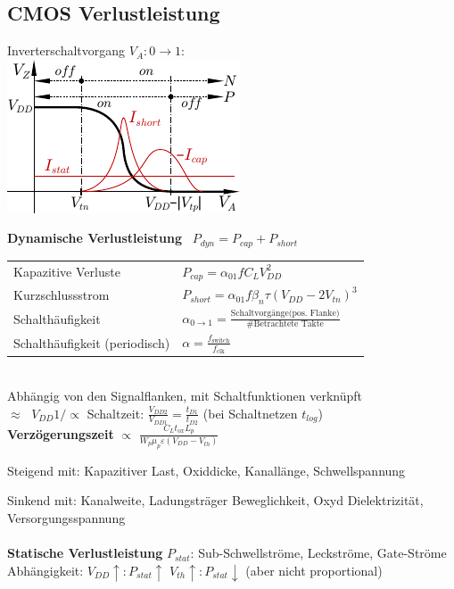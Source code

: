 \documentclass[6pt,a4paper]{scrartcl}
\renewcommand{\emph}[1]{\textsf{\textbf{#1}}}
\newcommand{\ra}[0]{\ensuremath{\rightarrow}} 									%
\begin{document}
\begin{multicols*}{3}
	\subsection{CMOS Verlustleistung}
	Inverterschaltvorgang $V_A: 0 \ra 1$:\\
	\includegraphics{./img/ds/char_inverter.pdf}
	
	\emph{Dynamische Verlustleistung} \qquad \ $P_{dyn} = P_{cap} + P_{short}$\\
	\begin{tabular}{ll}
		\quad Kapazitive Verluste \qquad \ \quad \ & $P_{cap} = \alpha_{01} f C_L V_{DD}^2$\\
		\quad Kurzschlussstrom	& $P_{short} = \alpha_{01} f \beta_n \tau (V_{DD} - 2V_{tn})^3$\\[0.8em]
		\quad Schalthäufigkeit & $\alpha_{0 \rightarrow 1} = \frac{\text{Schaltvorgänge(pos. Flanke)}}{\text{\# Betrachtete Takte}}$\\
		\quad Schalthäufigkeit (periodisch) & $\alpha = \frac{f_\text{switch}}{f_\text{clk}}$\\
	\end{tabular}\\
	Abhängig von den Signalflanken, mit Schaltfunktionen verknüpft\\ 
	$\approx \;$ $V_{DD} 1/\propto $ Schaltzeit: $\frac{V_{DD2}}{V_{DD1}} = \frac{t_{D1}}{t_{D2}}$ (bei Schaltnetzen $t_{log}$)\\
	\textbf{Verzögerungszeit} $\propto$ $\frac{C_Lt_{ox}L_p}{W_p\mu_p\varepsilon(V_{DD} - V_{th})}$
	
	Steigend mit: Kapazitiver Last, Oxiddicke, Kanallänge, Schwellspannung
	
	Sinkend mit: Kanalweite, Ladungsträger Beweglichkeit, Oxyd Dielektrizität, Versorgungsspannung \\ \\
	\emph{Statische Verlustleistung} $P_{stat}$: Sub-Schwellströme, Leckströme, Gate-Ströme
	Abhängigkeit: $V_{DD}\uparrow:P_{stat}\uparrow$ \qquad $V_{th}\uparrow:P_{stat}\downarrow$ \quad (aber nicht proportional)


\end{multicols*}
\end{document}
